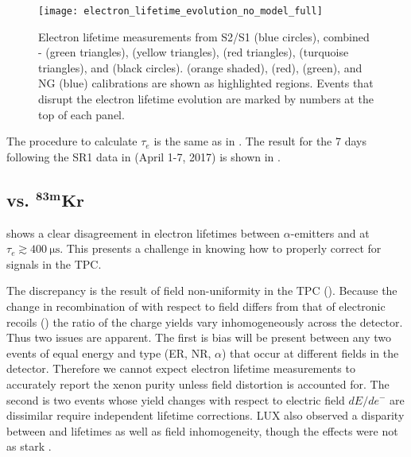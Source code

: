 \begin{figure}
\centering
\texttt{[image: electron\_lifetime\_evolution\_no\_model\_full]}
\caption[Electron lifetime measurements over the lifetime of XENON1T.]{Electron lifetime measurements from S2/S1 (blue circles), combined
- (green triangles), 
(yellow triangles),  (red triangles),  (turquoise triangles), and
\metakr (black circles).  \metakr (orange shaded),  (red), \ambe (green), and NG (blue) calibrations
are shown as highlighted regions.  Events that disrupt the electron lifetime evolution are marked by numbers at the top of each panel.}
\label{fig:electron_lifetimes_evolution_no_model}
\end{figure}

The procedure to calculate $\tau_e$ is the same as in .  The result for the
7 days following the SR1 \ambe data in  (April 1-7, 2017)
is shown in .



\subsection[\ce{^{222}Rn} vs. $\mathrm{^{83m}Kr}$][\ce{^{222}Rn} vs. $\mathrm{^{83m}Kr}$]{ vs. $\mathbf{^{83m}Kr}$}
\label{subsec:electron_lifetimes_rn222_vs_kr83m}
 shows a clear disagreement in electron lifetimes between $\alpha$-emitters and \metakr
at $\tau_e \gtrsim 400\ \mathrm{\mu s}$.  This presents a challenge in knowing how to properly correct \stwob for signals in the TPC.

The discrepancy is the result of field non-uniformity in the TPC ().  Because the change in recombination
of \alphadecays with respect to field differs from that of electronic recoils () the ratio
of the charge yields vary
inhomogeneously across the detector.  Thus two issues are apparent.  The first is bias will be present between any two events of equal
energy and type (ER, NR, $\alpha$) that occur at different fields in the detector.  Therefore we cannot expect electron lifetime
measurements to accurately
report the xenon purity unless field distortion is accounted for.  The second is two events whose \electron yield changes with respect to
electric field
$dE/de^-$ are dissimilar require independent lifetime corrections.  LUX also observed a disparity between \metakr and 
lifetimes as well as field inhomogeneity, though the effects were not as stark .

